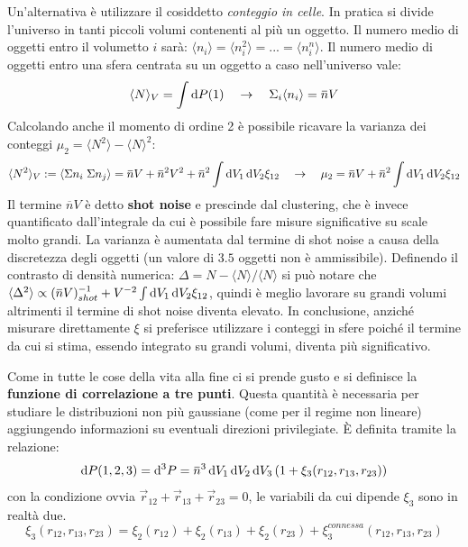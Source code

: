 Un'alternativa è utilizzare il cosiddetto \textit{conteggio in celle}. In pratica si divide l'universo in tanti piccoli volumi contenenti al più un oggetto. Il numero medio di oggetti entro il volumetto $i$ sarà: $\langle n_i\rangle = \langle n_i^2\rangle = ... =\langle n_i^n\rangle$.
Il numero medio di oggetti entro una sfera centrata su un oggetto a caso nell'universo vale:
\begin{equation}
    \langle N\rangle_V = \int \d{P}(1) \quad \to \quad \Sigma_i \langle n_i\rangle = \overbar{n}V
\end{equation}
Calcolando anche il momento di ordine 2 è possibile ricavare la varianza dei conteggi $\mu_2= \langle N^2 \rangle - \langle N \rangle^2 $:
\begin{equation}
    \langle N^2\rangle_V := \langle\Sigma n_i\; \Sigma n_j \rangle =\overbar{n}V+ \overbar{n}^2V^2 + \overbar{n}^2\int \d{V_1}\d{V_2}\xi_{12} \quad \to \quad \mu_2 = \overbar{n}V+ \overbar{n}^2\int \d{V_1}\d{V_2}\xi_{12}
\end{equation}
Il termine $\overbar{n}V$ è detto \textbf{shot noise} e prescinde dal clustering, che è invece quantificato dall'integrale da cui è possibile fare misure significative su scale molto grandi. La varianza è aumentata dal termine di shot noise a causa della discretezza degli oggetti (un valore di $3.5$ oggetti non è ammissibile). Definendo il contrasto di densità numerica: $\Delta = N - \langle N \rangle / \langle N \rangle$ si può notare che $ \langle \Delta^2 \rangle \propto (\overbar{n}V)^{-1}_{shot}+ V^{-2}\int \d{V_1}\d{V_2}\xi_{12}$, quindi è meglio lavorare su grandi volumi altrimenti il termine di shot noise diventa elevato.
In conclusione, anziché misurare direttamente $\xi$ si preferisce utilizzare i conteggi in sfere poiché il termine da cui si stima, essendo integrato su grandi volumi, diventa più significativo.

\vspace{1em}
Come in tutte le cose della vita alla fine ci si prende gusto e si definisce la \textbf{funzione di correlazione a tre punti}. Questa quantità è necessaria per studiare le distribuzioni non più gaussiane (come per il regime non lineare) aggiungendo informazioni su eventuali direzioni privilegiate. È definita tramite la relazione:
\begin{equation}
    \d{P(1,2,3)}=\d{^3 P}= \overbar{n}^3 \d{V_1}\d{V_2}\d{V_3}\left(1+\xi_3 (r_{12}, r_{13},r_{23})\right)
\end{equation}
con la condizione ovvia $\vec{r}_{12}+ \vec{r}_{13}+\vec{r}_{23}=0$, le variabili da cui dipende $\xi_3$ sono in realtà due. 
\begin{equation}
    \xi_3 (r_{12}, r_{13}, r_{23}) = \xi_2(r_{12}) + \xi_2(r_{13}) + \xi_2(r_{23})+\xi_3^{connessa} (r_{12}, r_{13}, r_{23})
\end{equation}

